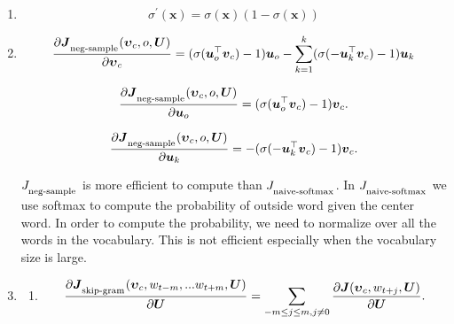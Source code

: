 \documentclass[]{article}
\begin{document}
\begin{enumerate}
\begin{enumerate}
		\item
		\begin{equation}
		\sigma^{\prime}(\boldsymbol{x}) = \sigma(\boldsymbol{x}) (1 - \sigma(\boldsymbol{x}))
		\end{equation}
		
		\item
		\begin{equation}
		\frac{\partial 		\boldsymbol{J}_\textsubscript{neg-sample}(\boldsymbol{\upsilon}_c, o, \boldsymbol{U})}{\partial \boldsymbol{\upsilon}_c} = 
		(\sigma(\boldsymbol{u}_{o}^\top \boldsymbol{v}_c) - 1) \boldsymbol{u}_{o} -
		\sum_{k=1}^{k} (\sigma(- \boldsymbol{u}_{k}^\top \boldsymbol{v}_c) - 1) \boldsymbol{u}_{k}
		\end{equation}

		\begin{equation}
		\frac{\partial 		\boldsymbol{J}_\textsubscript{neg-sample}(\boldsymbol{\upsilon}_c, o, \boldsymbol{U})}{\partial \boldsymbol{u}_o} = 
		(\sigma(\boldsymbol{u}_{o}^\top \boldsymbol{v}_c) - 1) \boldsymbol{v}_{c}.
		\end{equation}
		
		\begin{equation}
		\frac{\partial 		\boldsymbol{J}_\textsubscript{neg-sample}(\boldsymbol{\upsilon}_c, o, \boldsymbol{U})}{\partial \boldsymbol{u}_k} = 
		-(\sigma(-\boldsymbol{u}_{k}^\top \boldsymbol{v}_c) - 1) \boldsymbol{v}_{c}.
		\end{equation}
		
		$J_\textsubscript{neg-sample}$ is more efficient to compute than $J_\textsubscript{naive-softmax}$. In $J_\textsubscript{naive-softmax}$ we use softmax to compute the probability of outside word given the center word. In order to compute the probability, we need to normalize over all the words in the vocabulary. This is not efficient especially when the vocabulary size is large.
		
		\item
		
		\begin{enumerate}
			\item 
			
		\begin{equation}
		\frac{\partial 		\boldsymbol{J}_\textsubscript{skip-gram}(\boldsymbol{\upsilon}_c, w_{t-m},... w_{t+m}, \boldsymbol{U})}{\partial \boldsymbol{U}} = 
		\sum_{-m \leq j \leq m, j \neq 0} \frac{\partial 		\boldsymbol{J}(\boldsymbol{\upsilon}_c, w_{t+j}, \boldsymbol{U})}{\partial \boldsymbol{U}}.
		\end{equation}
		

\end{enumerate}
\end{enumerate}
\end{enumerate}
\end{document}

